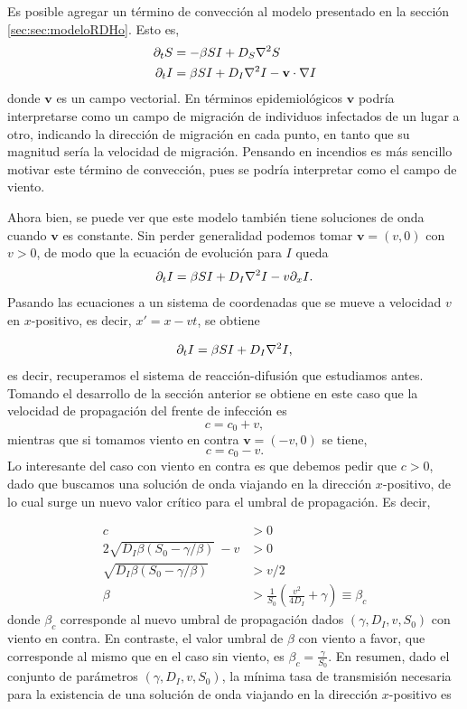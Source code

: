
Es posible agregar un término de convección al modelo presentado en la sección \ref{sec:sec:modeloRDHo}. Esto es,
\begin{align}
  \partial_t S & = -\beta SI + D_S \laplacian{S} \label{S_eq_v}\\
  \partial_t I &= \beta SI + D_I \laplacian{I}- \mathbf{v} \cdot \nabla I \label{I_eq_v}
\end{align}
donde $\mathbf{v}$ es un campo vectorial. En términos epidemiológicos $\mathbf{v}$ podría interpretarse 
como un campo de migración de individuos infectados de un lugar a otro, indicando la dirección de migración en cada punto, en tanto que su magnitud 
sería la velocidad de migración. Pensando en incendios es más sencillo motivar este término de convección, pues se podría interpretar como el campo de viento. 

Ahora bien, se puede ver que este modelo también tiene soluciones de onda cuando $\mathbf{v}$ es constante. Sin perder generalidad podemos tomar $\mathbf{v}=(v,0)$ con 
$v>0$, de modo que la ecuación de evolución para $I$ queda
\begin{equation}
  \partial_t I = \beta SI + D_I \laplacian{I}- v \partial_x I.
\end{equation}
Pasando las ecuaciones a un sistema de coordenadas que se mueve a velocidad $v$ en $x$-positivo, es decir, $x'=x-vt$, se obtiene 

\begin{equation}
  \partial_t I = \beta SI + D_I \laplacian{I},
\end{equation}
es decir, recuperamos el sistema de reacción-difusión que estudiamos antes. Tomando el desarrollo de la sección anterior se obtiene en este caso que la velocidad de propagación 
del frente de infección es 
$$c = c_0 + v,$$
mientras que si tomamos viento en contra $\mathbf{v} = (-v,0)$ se tiene,
$$c = c_0 - v.$$
Lo interesante del caso con viento en contra es que debemos pedir que $c>0$, dado que buscamos una solución de onda viajando en la dirección $x$-positivo, de lo cual surge un nuevo valor crítico para el umbral de propagación. Es decir,

\begin{align}
  c &> 0 \nonumber \\
  2\sqrt{D_I\beta(S_0-\gamma/\beta)}\ - v &> 0 \nonumber \\
  \sqrt{D_I\beta(S_0-\gamma/\beta)} &> v/2 \nonumber \\
  \beta &> \frac{1}{S_0}(\frac{v^2}{4D_I}+\gamma) \equiv \beta_c 
\end{align}
donde $\beta_c$ corresponde al nuevo umbral de propagación dados $(\gamma,D_I,v,S_0)$ con viento en contra. En contraste, el valor umbral de $\beta$ con viento a favor, que 
corresponde al mismo que en el caso sin viento, es $\beta_c = \frac{\gamma}{S_0}$. En resumen, dado el conjunto de parámetros $(\gamma,D_I,v,S_0)$, la mínima tasa de transmisión
necesaria para la existencia de una solución de onda viajando en la dirección $x$-positivo es

